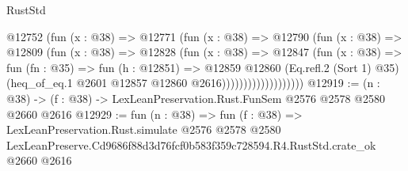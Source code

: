 \begin{lexlean}{RustStd}
\begin{coremodule}
                          @12752
                            (fun (x : @38) =>
                            @12771
                              (fun (x : @38) =>
                              @12790
                                (fun (x : @38) =>
                                @12809
                                  (fun (x : @38) =>
                                  @12828
                                    (fun (x : @38) =>
                                    @12847
                                      (fun (x : @38) =>
                                      fun (fn : @35) =>
                                      fun (h : @12851) =>
                                      @12859
                                        @12860
                                        (Eq.refl.{2} (Sort 1) @35)
                                        (heq_of_eq.{1} @2601 @12857 @12860 @2616)))))))))))))))))))
@12919 := (n : @38) -> (f : @38) -> LexLeanPreservation.Rust.FunSem @2576 @2578 @2580 @2660 @2616
@12929 := fun (n : @38) =>
  fun (f : @38) =>
  LexLeanPreservation.Rust.simulate
    @2576
    @2578
    @2580
    LexLeanPreserve.Cd9686f88d3d76fcf0b583f359c728594.R4.RustStd.crate_ok
    @2660
    @2616
\end{coremodule}
\end{lexlean}
